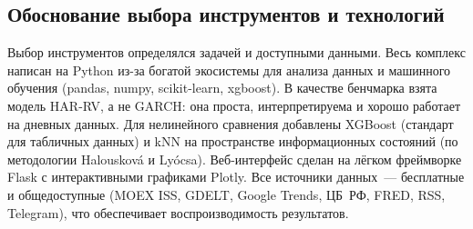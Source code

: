 \subsection*{Обоснование выбора инструментов и технологий}

Выбор инструментов определялся задачей и доступными данными. Весь комплекс
написан на Python из-за богатой экосистемы для анализа данных и машинного
обучения (pandas, numpy, scikit-learn, xgboost). В качестве бенчмарка взята
модель HAR-RV, а не GARCH: она проста, интерпретируема и хорошо работает на
дневных данных. Для нелинейного сравнения добавлены XGBoost (стандарт для
табличных данных) и kNN на пространстве информационных состояний (по
методологии Halousková и Lyócsa). Веб-интерфейс сделан на лёгком фреймворке
Flask с интерактивными графиками Plotly. Все источники данных~--- бесплатные и
общедоступные (MOEX ISS, GDELT, Google Trends, ЦБ~РФ, FRED, RSS, Telegram),
что обеспечивает воспроизводимость результатов.

